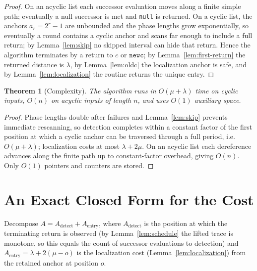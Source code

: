 \documentclass[11pt]{article}
\newtheorem{theorem}{Theorem}[section]
\newcommand{\nullnode}{\texttt{null}}
\newcommand{\newc}{\texttt{newc}}
\begin{document}
\begin{proof}
On an acyclic list each successor evaluation moves along a finite simple path;
eventually a null successor is met and \nullnode{} is returned. On a cyclic list,
the anchors $a_r=2^r-1$ are unbounded and the phase lengths grow exponentially,
so eventually a round contains a cyclic anchor and scans far enough to include a
full return; by Lemma~\ref{lem:skip} no skipped interval can hide that return.
Hence the algorithm terminates by a return to $c$ or $\newc$; by
Lemma~\ref{lem:first-return} the returned distance is $\lambda$, by
Lemma~\ref{lem:oldc} the localization anchor is safe, and by
Lemma~\ref{lem:localization} the routine returns the unique entry.
\end{proof}

\begin{theorem}[Complexity]
\label{thm:complexity}
The algorithm runs in $O(\mu+\lambda)$ time on cyclic inputs, $O(n)$ on acyclic
inputs of length $n$, and uses $O(1)$ auxiliary space.
\end{theorem}

\begin{proof}
Phase lengths double after failures and Lemma~\ref{lem:skip} prevents immediate
rescanning, so detection completes within a constant factor of the first position
at which a cyclic anchor can be traversed through a full period, i.e.
$O(\mu+\lambda)$; localization costs at most $\lambda+2\mu$. On an acyclic list
each dereference advances along the finite path up to constant-factor overhead,
giving $O(n)$. Only $O(1)$ pointers and counters are stored.
\end{proof}

\section{An Exact Closed Form for the Cost}
\label{sec:closedform}

Decompose $A=A_{\mathrm{detect}}+A_{\mathrm{entry}}$, where $A_{\mathrm{detect}}$
is the position at which the terminating return is observed (by
Lemma~\ref{lem:schedule} the lifted trace is monotone, so this equals the count
of successor evaluations to detection) and $A_{\mathrm{entry}}=\lambda+2(\mu-o)$
is the localization cost (Lemma~\ref{lem:localization}) from the retained anchor
at position $o$.
\end{document}
